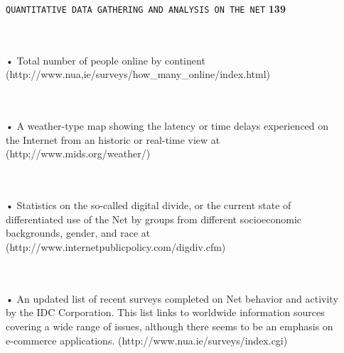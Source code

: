 \documentclass{book}
\begin{document}
\begin{flushright}
\texttt{QUANTITATIVE DATA GATHERING AND ANALYSIS ON THE NET}
\hspace*{0.5cm}
\textbf{139}
\end{flushright}
\vspace*{0.6cm}
\\\hspace*{0.5cm}\\• Total number of people online by continent
\\\hspace*{0.5cm}(http://www.nua,ie/surveys/how_many_online/index.html)

\\\hspace*{0.5cm}\\• A weather-type map showing the latency or time delays experienced on
\\\hspace*{0.5cm}the Internet from an historic or real-time view at
\\\hspace*{0.5cm}(http;//www.mids.org/weather/)

\\\hspace*{0.5cm}\\• Statistics on the so-called digital divide, or the current state of
\\\hspace*{0.5cm}differentiated use of the Net by groups from different socioeconomic
\\\hspace*{0.5cm}backgrounds, gender, and race at (http://www.internetpublicpolicy.com/digdiv.cfm)

\\\hspace*{0.5cm}\\• An updated list of recent surveys completed on Net behavior and activity
\\\hspace*{0.5cm}by the IDC Corporation. This list links to worldwide information sources
\\\hspace*{0.5cm}covering a wide range of issues, although there seems to be an emphasis on
\\\hspace*{0.5cm}e-commerce applications. (http://www.nua.ie/surveys/index.cgi)\\
\end{document}
